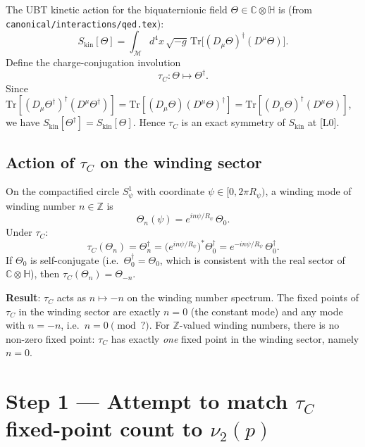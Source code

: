 \documentclass[12pt,a4paper]{article}
\begin{document}
The UBT kinetic action for the biquaternionic field $\Theta \in \mathbb{C}\otimes\mathbb{H}$
is (from \texttt{canonical/interactions/qed.tex}):
\begin{equation}
  S_{\mathrm{kin}}[\Theta]
  = \int_{\mathcal{M}} d^4x\,\sqrt{-g}\,
    \mathrm{Tr}\bigl[(D_\mu\Theta)^\dagger (D^\mu\Theta)\bigr].
\end{equation}
Define the charge-conjugation involution
\begin{equation}
  \tau_C : \Theta \mapsto \Theta^\dagger.
\end{equation}
Since $\mathrm{Tr}[(D_\mu\Theta^\dagger)^\dagger(D^\mu\Theta^\dagger)]
= \mathrm{Tr}[(D_\mu\Theta)(D^\mu\Theta)^\dagger]
= \mathrm{Tr}[(D_\mu\Theta)^\dagger(D^\mu\Theta)]$,
we have $S_{\mathrm{kin}}[\Theta^\dagger] = S_{\mathrm{kin}}[\Theta]$.
Hence $\tau_C$ is an exact symmetry of $S_{\mathrm{kin}}$ at [L0].

\subsection{Action of $\tau_C$ on the winding sector}

On the compactified circle $S^1_\psi$ with coordinate $\psi \in [0, 2\pi R_\psi)$,
a winding mode of winding number $n \in \mathbb{Z}$ is
\begin{equation}
  \Theta_n(\psi) = e^{in\psi/R_\psi}\,\Theta_0.
\end{equation}
Under $\tau_C$:
\begin{equation}
  \tau_C(\Theta_n) = \Theta_n^\dagger
  = \bigl(e^{in\psi/R_\psi}\bigr)^* \Theta_0^\dagger
  = e^{-in\psi/R_\psi}\,\Theta_0^\dagger.
\end{equation}
If $\Theta_0$ is self-conjugate (i.e.\ $\Theta_0^\dagger = \Theta_0$, which is
consistent with the real sector of $\mathbb{C}\otimes\mathbb{H}$), then
$\tau_C(\Theta_n) = \Theta_{-n}$.

\textbf{Result}: $\tau_C$ acts as $n \mapsto -n$ on the winding number spectrum.
The fixed points of $\tau_C$ in the winding sector are exactly $n = 0$
(the constant mode) and any mode with $n = -n$, i.e.\ $n = 0 \pmod{?}$.
For $\mathbb{Z}$-valued winding numbers, there is no non-zero fixed point:
$\tau_C$ has exactly \emph{one} fixed point in the winding sector, namely $n = 0$.

\section{Step 1 — Attempt to match $\tau_C$ fixed-point count to $\nu_2(p)$}
\label{sec:step1}
\end{document}
